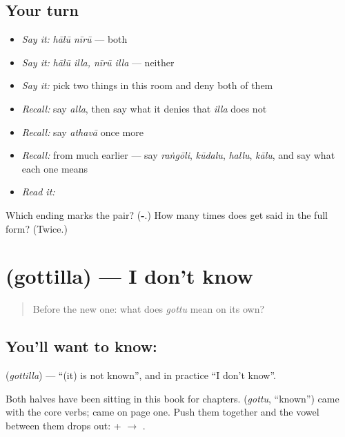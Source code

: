\subsection*{Your turn}
\begin{itemize}
\raggedright
  \item \emph{Say it:} \emph{hālū nīrū} — both
  \item \emph{Say it:} \emph{hālū illa, nīrū illa} — neither
  \item \emph{Say it:} pick two things in this room and deny both of them
  \item \emph{Recall:} say \emph{alla}, then say what it denies that \emph{illa} does not
  \item \emph{Recall:} say \emph{athavā} once more
  \item \emph{Recall:} from much earlier — say \emph{raṅgōli}, \emph{kūdalu}, \emph{hallu}, \emph{kālu}, and say what each one means
  \item \emph{Read it:} \textbf{}
\end{itemize}

\begin{tcolorbox}[breakable,colback=teal!4,colframe=teal!35!black,title={Before you move on}]
Which ending marks the pair? (\textbf{-}.) How many times does  get said in the full form? (Twice.)
\end{tcolorbox}
\section[\texorpdfstring{\kn{ಗೊತ್ತಿಲ್ಲ} (gottilla)}{ಗೊತ್ತಿಲ್ಲ (gottilla)}]{ (gottilla) — I don't know}

\label{lesson:KA-C68-dont-know}



\begin{quote}
Before the new one: what does \emph{gottu} mean on its own?
\end{quote}

\subsection*{You'll want to know: }
\textbf{} (\emph{gottilla}) — \textquotedblleft{}(it) is not known\textquotedblright{}, and in practice \textquotedblleft{}I don't know\textquotedblright{}.

Both halves have been sitting in this book for chapters.  (\emph{gottu}, \textquotedblleft{}known\textquotedblright{}) came with the core verbs;  came on page one. Push them together and the vowel between them drops out:  +  $\to$ .


